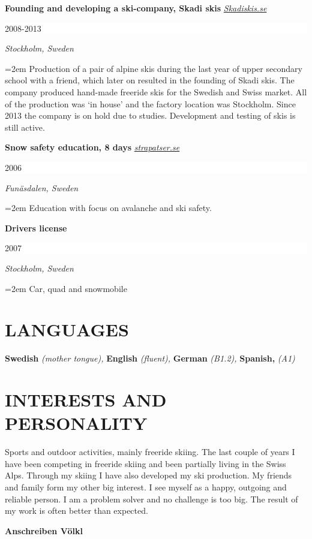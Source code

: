 \documentclass[paper=letter,fontsize=11pt]{scrartcl} %
\newcommand{\sepspace}{\vspace*{1em}}		%
\newcommand{\NewPart}[2]{\section*{\uppercase{#1} \small \normalfont #2}}
\newcommand{\NewParttwo}[1]{
		\noindent \huge \textbf{#1}
        \normalsize \par}
\newcommand{\WorkEntry}[5]{
		\noindent \textbf{#1}
        \noindent \small \textit{#2}
        \hfill      %
        \colorbox{White}{%
			\parbox{6em}{%
			\hfill\color{Black}#3}} \par  %
		\noindent \textit{#4} \par        %
		\noindent\hangindent=2em\hangafter=0 \small #5 %
		\normalsize \par}
\newcommand{\Language}[2]{
		\noindent \textbf{#1}
        \noindent \small \textit{#2}}
\newcommand{\Text}[1]{\par       
		\noindent \small #1 
		\normalsize \par}
\begin{document}
\WorkEntry{Founding and developing a ski-company, Skadi skis}{\href{https://www.facebook.com/skadiskis/}{Skadiskis.se}}{2008-2013}{Stockholm, Sweden}{Production of a pair of alpine skis during the last year of upper secondary school with a friend, which later on resulted in the founding of Skadi skis.
The company produced hand-made freeride skis for the Swedish and Swiss market. All of the production was ‘in house’ and the factory location was Stockholm. Since 2013 the company is on hold due to studies. Development and testing of skis is still active.}
\sepspace

\WorkEntry{Snow safety education, 8 days}{\href{http://www.strapatser.se}{strapatser.se}}{2006}{Funäsdalen, Sweden}{Education with focus on avalanche and ski safety.}
\sepspace
\WorkEntry{Drivers license}{}{2007}{Stockholm, Sweden}{Car, quad and snowmobile}


\NewPart{LANGUAGES}{}

\Language{Swedish}{(mother tongue),}\Language{English}{(fluent),}\Language{German}{(B1.2),}\Language{Spanish,}{(A1)}


\NewPart{Interests and personality}{}

\Text{Sports and outdoor activities, mainly freeride skiing. The last couple of years I have been competing in freeride skiing and been partially living in the Swiss Alps. Through my skiing I have also developed my ski production. My friends and family form my other big interest. I see myself as a happy, outgoing and reliable person. I am a problem solver and no challenge is too big. The result of my work is often better than expected.}

\newpage


\NewParttwo{Anschreiben Völkl}

\sepspace
\end{document}

